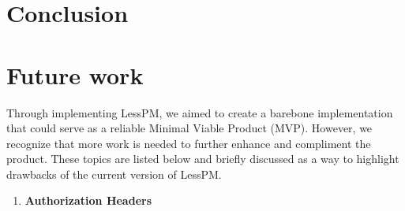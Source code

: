 \documentclass{article}
\begin{document}






    \section*{Conclusion}

    \section*{Future work}\label{sec:futurework}
    Through implementing LessPM, we aimed to create a barebone implementation that could serve as a reliable Minimal
    Viable Product (MVP). However, we recognize that more work is needed to further enhance and compliment the product.
    These topics are listed below and briefly discussed as a way to highlight drawbacks of the current version of LessPM.

    \begin{enumerate}[label=$\blacktriangleright$]
        \item \textbf{Authorization Headers}
    \end{enumerate}

    \printbibliography
\end{document}
